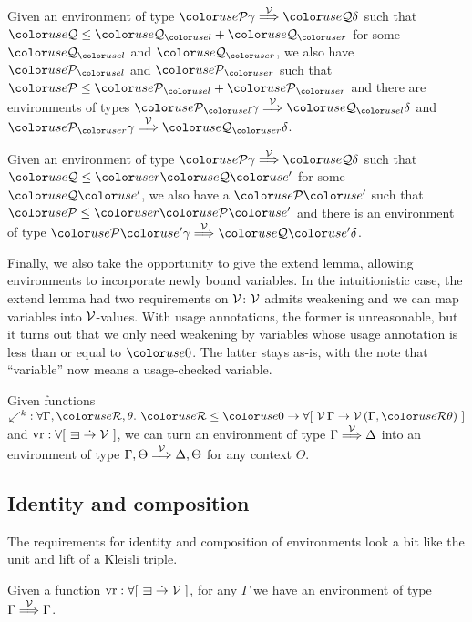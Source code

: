 \begin{lemma}\label{thm:lr-env-add}
  Given an environment of type $\grP\gamma \env\V \grQ\delta$ such that
  $\grQ \leq \grQl + \grQr$ for some $\grQl$ and $\grQr$, we also have $\grPl$
  and $\grPr$ such that $\grP \leq \grPl + \grPr$ and there are environments
  of types $\grPl\gamma \env\V \grQl\delta$ and
  $\grPr\gamma \env\V \grQr\delta$.
\end{lemma}

\begin{lemma}\label{thm:lr-env-scale}
  Given an environment of type $\grP\gamma \env\V \grQ\delta$ such that
  $\grQ \leq \gr r\grQprime$ for some $\grQprime$, we also have a $\grPprime$
  such that $\grP \leq \gr r\grPprime$ and there is an environment of type
  $\grPprime\gamma \env\V \grQprime\delta$.
\end{lemma}

Finally, we also take the opportunity to give the extend lemma, allowing
environments to incorporate newly bound variables.
In the intuitionistic case, the extend lemma had two requirements on $\mathcal V$: $\mathcal V$
admits weakening and we can map variables into $\mathcal V$-values.
With usage annotations, the former is unreasonable, but it turns out that we
only need weakening by variables whose usage annotation is less than or equal
to $\gr0$.
The latter stays as-is, with the note that ``variable'' now means a
usage-checked variable.

\begin{lemma}[extend]\label{thm:lr-bind}
  Given functions
  ${\swarrow^k} : \forall \Gamma, \grR, \theta.~\grR \leq \gr0 \to
  \forallb{\V\,\Gamma \dotto \V\,\plr{\Gamma, \grR\theta}}$ and
  $\mathrm{vr} : \forallb{{\sqni} \dotto \V}$, we can turn an environment of
  type $\Gamma \stackrel{\mathcal V}\Longrightarrow \Delta$ into an environment of type
  $\Gamma, \Theta \stackrel{\mathcal V}\Longrightarrow \Delta, \Theta$ for any context $\Theta$.
\end{lemma}

\subsection{Identity and composition}

The requirements for identity and composition of environments look a bit like
the unit and lift of a Kleisli triple.

\begin{lemma}\label{thm:env-id}
  Given a function $\mathrm{vr} : \forallb{{\sqni} \dotto \V}$, for any
  $\Gamma$ we have an environment of type $\Gamma \stackrel{\mathcal V}\Longrightarrow \Gamma$.
\end{lemma}

